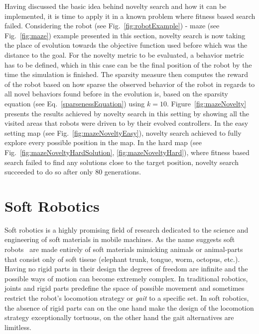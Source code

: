 Having discussed the basic idea behind novelty search and how it can be implemented, it is time to apply it in a known problem where fitness based search failed. Considering the robot (see Fig.~\ref{fig:robotExample}) - maze (see Fig.~\ref{fig:maze}) example presented in this section, novelty search is now taking the place of evolution towards the objective function used before which was the distance to the goal. For the novelty metric to be evaluated, a behavior metric has to be defined, which in this case can be the final position of the robot by the time the simulation is finished. The sparsity measure then computes the reward of the robot based on how sparse the observed behavior of the robot in regards to all novel behaviors found before in the evolution is, based on the sparsity equation (see Eq.~\ref{sparsenessEquation}) using $k = 10$. Figure~\ref{fig:mazeNovelty} presents the results achieved by novelty search in this setting by showing all the visited areas that robots were driven to by their evolved controllers. In the easy setting map (see Fig.~\ref{fig:mazeNoveltyEasy}), novelty search achieved to fully explore every possible position in the map. In the hard map (see Fig.~\ref{fig:mazeNoveltyHardSolution}, \ref{fig:mazeNoveltyHard}), where fitness based search failed to find any solutions close to the target position, novelty search succeeded to do so after only $80$ generations.



\section{Soft Robotics}
Soft robotics is a highly promising field of research dedicated to the science and engineering of soft materials in mobile machines. As the name suggests soft robots~\citep{trivedi2008soft, pfeifer2012challenges} are made entirely of soft materials mimicking animals or animal-parts that consist only of soft tissue (elephant trunk, tongue, worm, octopus, etc.). Having no rigid parts in their design the degrees of freedom are infinite and the possible ways of motion can become extremely complex. In traditional robotics, joints and rigid parts predefine the space of possible movement and sometimes restrict the robot's locomotion strategy or \emph{gait} to a specific set. In soft robotics, the absence of rigid parts can on the one hand make the design of the locomotion strategy exceptionally tortuous, on the other hand the gait alternatives are limitless.


